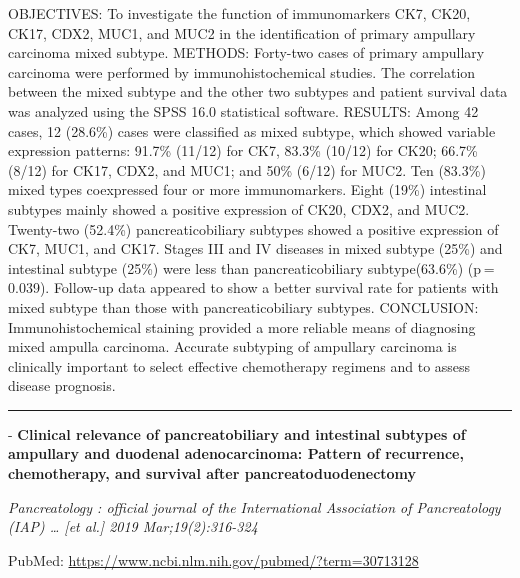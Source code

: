 \documentclass[]{article}
\begin{document}
OBJECTIVES: To investigate the function of immunomarkers CK7, CK20,
CK17, CDX2, MUC1, and MUC2 in the identification of primary ampullary
carcinoma mixed subtype. METHODS: Forty-two cases of primary ampullary
carcinoma were performed by immunohistochemical studies. The correlation
between the mixed subtype and the other two subtypes and patient
survival data was analyzed using the SPSS 16.0 statistical software.
RESULTS: Among 42 cases, 12 (28.6\%) cases were classified as mixed
subtype, which showed variable expression patterns: 91.7\% (11/12) for
CK7, 83.3\% (10/12) for CK20; 66.7\% (8/12) for CK17, CDX2, and MUC1;
and 50\% (6/12) for MUC2. Ten (83.3\%) mixed types coexpressed four or
more immunomarkers. Eight (19\%) intestinal subtypes mainly showed a
positive expression of CK20, CDX2, and MUC2. Twenty-two (52.4\%)
pancreaticobiliary subtypes showed a positive expression of CK7, MUC1,
and CK17. Stages III and IV diseases in mixed subtype (25\%) and
intestinal subtype (25\%) were less than pancreaticobiliary
subtype(63.6\%) (p = 0.039). Follow-up data appeared to show a better
survival rate for patients with mixed subtype than those with
pancreaticobiliary subtypes. CONCLUSION: Immunohistochemical staining
provided a more reliable means of diagnosing mixed ampulla carcinoma.
Accurate subtyping of ampullary carcinoma is clinically important to
select effective chemotherapy regimens and to assess disease prognosis.

{}

{}

\begin{center}\rule{0.5\linewidth}{\linethickness}\end{center}

 - \textbf{Clinical relevance of pancreatobiliary and intestinal
subtypes of ampullary and duodenal adenocarcinoma: Pattern of
recurrence, chemotherapy, and survival after pancreatoduodenectomy}

\emph{Pancreatology : official journal of the International Association
of Pancreatology (IAP) \ldots{} {[}et al.{]} 2019 Mar;19(2):316-324}

PubMed: \url{https://www.ncbi.nlm.nih.gov/pubmed/?term=30713128}
\end{document}
